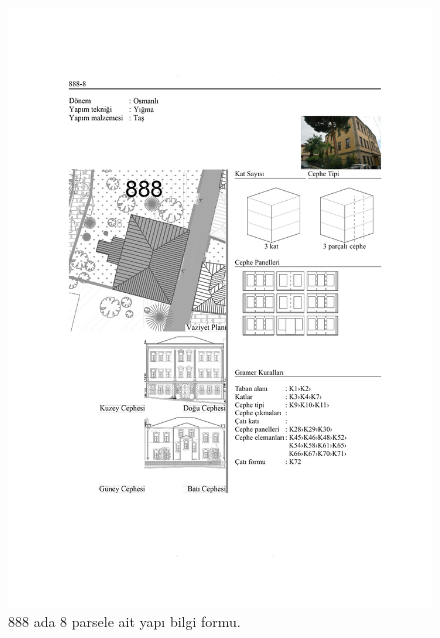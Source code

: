 \begin{figure}
\centering
\includegraphics[width=1\textwidth,height=\textheight]{source/figures/BilgiFormlari/888-8.pdf}
\caption{888 ada 8 parsele ait yapı bilgi formu.}
\end{figure}

